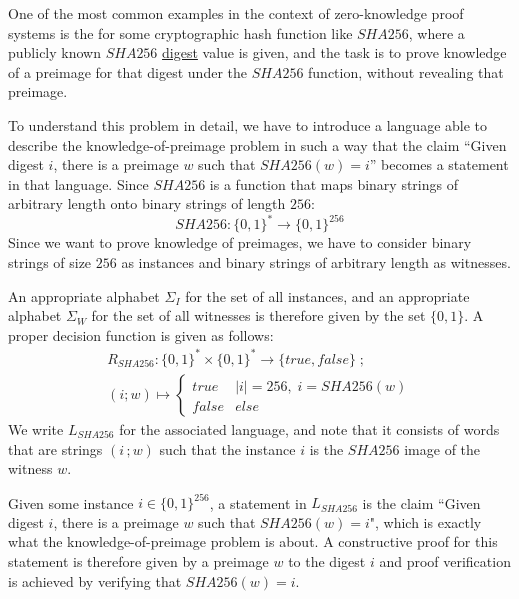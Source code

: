 \begin{example} One of the most common examples in the context of zero-knowledge proof systems is the  for some cryptographic hash function like $SHA256$, where a publicly known $SHA256$ \href{https://en.wikipedia.org/wiki/Hash_function}{digest} value is given, and the task is to prove knowledge of a preimage for that digest under the $SHA256$ function, without revealing that preimage. 

To understand this problem in detail, we have to introduce a language able to describe the knowledge-of-preimage problem in such a way that the claim ``Given digest $i$, there is a preimage $w$ such that $SHA256(w)=i$'' becomes a statement in that language. Since $SHA256$ is a function that maps binary strings of arbitrary length onto binary strings of length $256$:
$$
SHA256: \{0,1\}^* \to \{0,1\}^{256}
$$
Since we want to prove knowledge of preimages, we have to consider binary strings of size $256$ as instances and binary strings of arbitrary length as witnesses. 

An appropriate alphabet $\Sigma_I$ for the set of all instances, and an appropriate alphabet $\Sigma_W$ for the set of all witnesses is therefore given by the set $\{0,1\}$. A proper decision function is given as follows:
\begin{multline*}
R_{SHA256} : \{0,1\}^* \times \{0,1\}^* \to \{true, false\}\;;\;\\
(i;w) \mapsto
\begin{cases}
true & |i|=256,\; i = SHA256(w)\\
false & else
\end{cases}
\end{multline*}
We write $L_{SHA256}$ for the associated language, and note that it consists of words that are strings $(i\,;w)$ such that the instance $i$ is the $SHA256$ image of the witness $w$. 

Given some instance $i\in \{0,1\}^{256}$, a statement in $L_{SHA256}$ is the claim ``Given digest $i$, there is a preimage $w$ such that $SHA256(w)=i$", which is exactly what the knowledge-of-preimage problem is about. A constructive proof for this statement is therefore given by a preimage $w$ to the digest $i$ and proof verification is achieved by verifying that $SHA256(w)=i$. 
\end{example}
